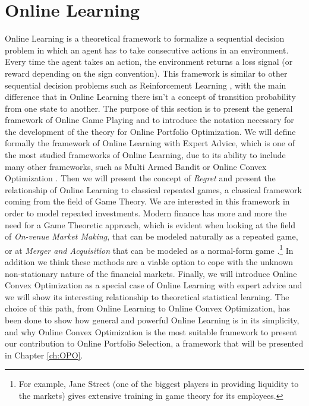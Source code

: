 \chapter{Online Learning}\label{ch:OnlineLearning}

Online Learning is a theoretical framework to formalize a sequential decision problem in which an agent has to take consecutive actions in an environment. Every time the agent takes an action, the environment returns a loss signal (or reward depending on the sign convention). This framework is similar to other sequential decision problems such as Reinforcement Learning \cite{sutton2018reinforcement}, with the main difference that in Online Learning there isn't a concept of transition probability from one state to another.
The purpose of this section is to present the general framework of Online Game Playing and to introduce the notation necessary for the development of the theory for Online Portfolio Optimization. We will define formally the framework of Online Learning with Expert Advice, which is one of the most studied frameworks of Online Learning, due to its ability to include many other frameworks, such as Multi Armed Bandit \cite{bubeck2012regret} or Online Convex Optimization \cite{hazan2016introduction}.
Then we will present the concept of \emph{Regret} and present the relationship of Online Learning to classical repeated games, a classical framework coming from the field of Game Theory. 
We are interested in this framework in order to model repeated investments.
Modern finance has more and more the need for a Game Theoretic approach, which is evident when looking at the field of \emph{On-venue Market Making}, that can be modeled naturally as a repeated game, or at \emph{Merger and Acquisition} that can be modeled as a normal-form game \cite{Yanqing_MaA}.\footnote{For example, Jane Street (one of the biggest players in providing liquidity to the markets) gives extensive training in game theory for its employees.} In addition we think these methods are a viable option to cope with the unknown non-stationary nature of the financial markets.
Finally, we will introduce Online Convex Optimization as a special case of Online Learning with expert advice and we will show its interesting relationship to theoretical statistical learning. The choice of this path, from Online Learning to Online Convex Optimization, has been done to show how general and powerful Online Learning is in its simplicity, and why Online Convex Optimization is the most suitable framework to present our contribution to Online Portfolio Selection, a framework that will be presented in Chapter \ref{ch:OPO}.

